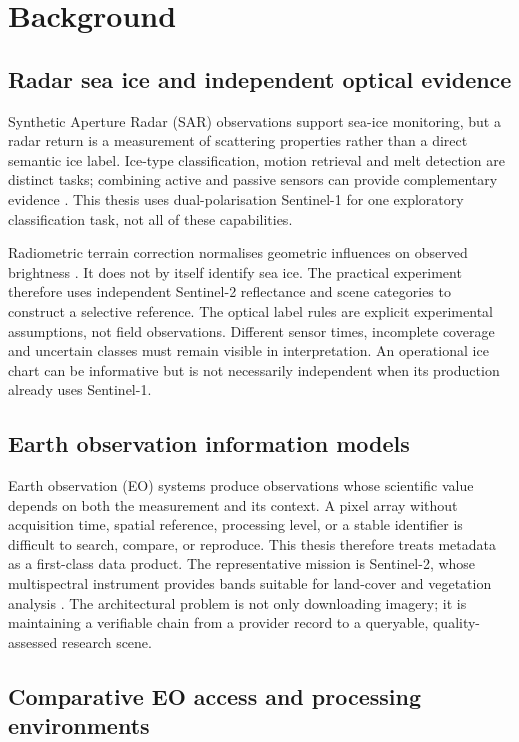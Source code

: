 \chapter{Background}

\section{Radar sea ice and independent optical evidence}

Synthetic Aperture Radar (SAR) observations support sea-ice monitoring, but a radar return is a measurement of
scattering properties rather than a direct semantic ice label. Ice-type classification,
motion retrieval and melt detection are distinct tasks; combining active and passive
sensors can provide complementary evidence \citep{dierking2013}. This thesis uses
dual-polarisation Sentinel-1 for one exploratory classification task, not all of these
capabilities.

Radiometric terrain correction normalises geometric influences on observed brightness
\citep{small2011}. It does not by itself identify sea ice. The practical experiment therefore
uses independent Sentinel-2 reflectance and scene categories to construct a selective
reference. The optical label rules are explicit experimental assumptions, not field
observations. Different sensor times, incomplete coverage and uncertain classes must
remain visible in interpretation. An operational ice chart can be informative but is
not necessarily independent when its production already uses Sentinel-1.

\section{Earth observation information models}

Earth observation (EO) systems produce observations whose scientific value depends on both the
measurement and its context. A pixel array without acquisition time, spatial reference, processing
level, or a stable identifier is difficult to search, compare, or reproduce. This thesis therefore
treats metadata as a first-class data product. The representative mission is Sentinel-2, whose
multispectral instrument provides bands suitable for land-cover and vegetation analysis
\cite{drusch2012sentinel}. The architectural problem is not only downloading imagery; it is
maintaining a verifiable chain from a provider record to a queryable, quality-assessed research
scene.

\section{Comparative EO access and processing environments}

